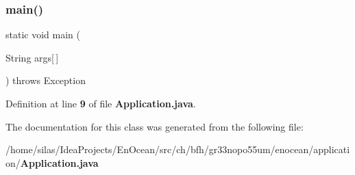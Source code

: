 \subsubsection{main()}
{\footnotesize\ttfamily static void main (\begin{DoxyParamCaption}\item[{String}]{args[$\,$] }\end{DoxyParamCaption}) throws Exception\hspace{0.3cm}{\ttfamily [static]}}



Definition at line {\bf 9} of file {\bf Application.\+java}.



The documentation for this class was generated from the following file\+:\begin{DoxyCompactItemize}
\item 
/home/silas/\+Idea\+Projects/\+En\+Ocean/src/ch/bfh/gr33nopo55um/enocean/application/{\bf Application.\+java}\end{DoxyCompactItemize}

